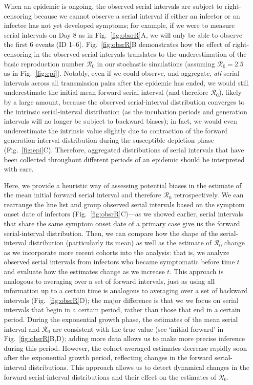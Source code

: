 \documentclass[12pt]{article}
\newcommand{\fref}[1]{Fig.~\ref{fig:#1}}
\newcommand{\Rx}[1]{\ensuremath{{\mathcal R}_{#1}}\xspace}
\newcommand{\Ro}{\Rx{0}}
\begin{document}
When an epidemic is ongoing, the observed serial intervals are subject to right-censoring because we cannot observe a serial interval if either an infector or an infectee has not yet developed symptoms;
for example, if we were to measure serial intervals on Day 8 as in \fref{obsrR}A, we will only be able to observe the first 6 events (ID 1--6).
\fref{obsrR}B demonstrates how the effect of right-censoring in the observed serial intervals translates to the underestimation of the basic reproduction number \Ro in our stochastic simulations (assuming $\Ro = 2.5$ as in \fref{epi}).
Notably, even if we could observe, and aggregate, \emph{all} serial intervals across all transmission pairs after the epidemic has ended, we would still underestimate the initial mean forward serial interval (and therefore \Ro), likely by a large amount, because the observed serial-interval distribution converges to the intrinsic serial-interval distribution (as the incubation periods and generation intervals will no longer be subject to backward biases);
in fact, we would even underestimate the intrinsic value slightly due to contraction of the forward generation-interval distribution during the susceptible depletion phase (\fref{epi}C).
Therefore, aggregated distributions of serial intervals that have been collected throughout different periods of an epidemic should be interpreted with care.

Here, we provide a heuristic way of assessing potential biases in the estimate of the mean initial forward serial interval and therefore \Ro retrospectively.
We can rearrange the line list and group observed serial intervals based on the symptom onset date of infectors (\fref{obsrR}C)---as we showed earlier, serial intervals that share the same symptom onset date of a primary case give us the forward serial-interval distribution.
Then, we can compare how the shape of the serial-interval distribution (particularly its mean) as well as the estimate of \Ro change as we incorporate more recent cohorts into the analysis:
that is, we analyze observed serial intervals from infectors who became symptomatic before time $t$ and evaluate how the estimates change as we increase $t$.
This approach is analogous to averaging over a set of forward intervals, just as using all information up to a certain time is analogous to averaging over a set of backward intervals (\fref{obsrR}D);
the major difference is that we we focus on serial intervals that begin in a certain period, rather than those that end in a certain period.
During the exponential growth phase, the estimates of the mean serial interval and \Ro are consistent with the true value (see `initial forward' in \fref{obsrR}B,D);
adding more data allows us to make more precise inference during this period.
However, the cohort-averaged estimates decrease rapidly soon after the exponential growth period, reflecting changes in the forward serial-interval distributions.
This approach allows us to detect dynamical changes in the forward serial-interval distributions and their effect on the estimates of \Ro.
\end{document}
